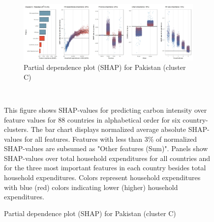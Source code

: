 \begin{figure}[ht!]
    \vspace{0.5cm}
   \begin{subfigure}[b]{\textwidth}  
   \centering
         \caption{Partial dependence plot (SHAP) for Pakistan (cluster C)}
         \label{fig:5b_PAK}
         \includegraphics[width=\textwidth]{Figure 5b/Figure_5b_PAK}
    \end{subfigure}
    \\
    \vspace{0.5cm}
   
    \begin{subcaption2}
     This figure shows SHAP-values for predicting carbon intensity over feature values for 88 countries in alphabetical order for six country-clusters. The bar chart displays normalized average absolute SHAP-values for all features. Features with less than 3\% of normalized SHAP-values are subsumed as "Other features (Sum)". Panels show SHAP-values over total household expenditures for all countries and for the three most important features in each country besides total household expenditures. Colors represent household expenditures with blue (red) colors indicating lower (higher) household expenditures.
     \end{subcaption2}
\end{figure}

